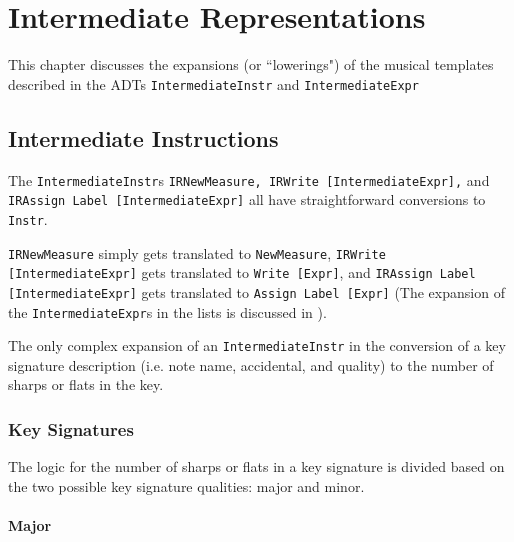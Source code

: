\documentclass{report}
\begin{document}
\chapter{Intermediate Representations}
\label{chap:ir}
This chapter discusses the expansions (or ``lowerings") of the musical templates described in the ADTs \verb.IntermediateInstr. and \verb.IntermediateExpr. 

\section{Intermediate Instructions}
The \verb.IntermediateInstr.s \verb.IRNewMeasure, IRWrite [IntermediateExpr],. and \\\verb.IRAssign Label [IntermediateExpr]. all have straightforward conversions to \verb.Instr.. 

\verb.IRNewMeasure. simply gets translated to \verb.NewMeasure., \verb.IRWrite [IntermediateExpr]. gets translated to \verb.Write [Expr]., and \verb.IRAssign Label [IntermediateExpr]. gets translated to \verb.Assign Label [Expr]. (The expansion of the \verb.IntermediateExpr.s in the lists is discussed in ). 

The only complex expansion of an \verb.IntermediateInstr. in the conversion of a key signature description (i.e. note name, accidental, and quality) to the number of sharps or flats in the key.

\subsection{Key Signatures}
The logic for the number of sharps or flats in a key signature is divided based on the two possible key signature qualities: major and minor. 
\subsubsection{Major}
\end{document}
